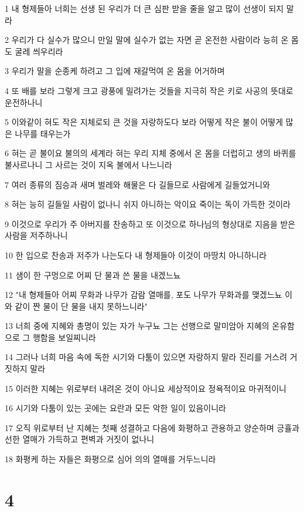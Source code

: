 \par 1 내 형제들아 너희는 선생 된 우리가 더 큰 심판 받을 줄을 알고 많이 선생이 되지 말라
\par 2 우리가 다 실수가 많으니 만일 말에 실수가 없는 자면 곧 온전한 사람이라 능히 온 몸도 굴레 씌우리라
\par 3 우리가 말을 순종케 하려고 그 입에 재갈먹여 온 몸을 어거하며
\par 4 또 배를 보라 그렇게 크고 광풍에 밀려가는 것들을 지극히 작은 키로 사공의 뜻대로 운전하나니
\par 5 이와같이 혀도 작은 지체로되 큰 것을 자랑하도다 보라 어떻게 작은 불이 어떻게 많은 나무를 태우는가
\par 6 혀는 곧 불이요 불의의 세계라 혀는 우리 지체 중에서 온 몸을 더럽히고 생의 바퀴를 불사르나니 그 사르는 것이 지옥 불에서 나느니라
\par 7 여러 종류의 짐승과 새며 벌레와 해물은 다 길들므로 사람에게 길들었거니와
\par 8 혀는 능히 길들일 사람이 없나니 쉬지 아니하는 악이요 죽이는 독이 가득한 것이라
\par 9 이것으로 우리가 주 아버지를 찬송하고 또 이것으로 하나님의 형상대로 지음을 받은 사람을 저주하나니
\par 10 한 입으로 찬송과 저주가 나는도다 내 형제들아 이것이 마땅치 아니하니라
\par 11 샘이 한 구멍으로 어찌 단 물과 쓴 물을 내겠느뇨
\par 12 "내 형제들아 어찌 무화과 나무가 감람 열매를, 포도 나무가 무화과를 맺겠느뇨 이와 같이 짠 물이 단 물을 내지 못하느니라"
\par 13 너희 중에 지혜와 총명이 있는 자가 누구뇨 그는 선행으로 말미암아 지혜의 온유함으로 그 행함을 보일찌니라
\par 14 그러나 너희 마음 속에 독한 시기와 다툼이 있으면 자랑하지 말라 진리를 거스려 거짓하지 말라
\par 15 이러한 지혜는 위로부터 내려온 것이 아니요 세상적이요 정욕적이요 마귀적이니
\par 16 시기와 다툼이 있는 곳에는 요란과 모든 악한 일이 있음이니라
\par 17 오직 위로부터 난 지혜는 첫째 성결하고 다음에 화평하고 관용하고 양순하며 긍휼과 선한 열매가 가득하고 편벽과 거짓이 없나니
\par 18 화평케 하는 자들은 화평으로 심어 의의 열매를 거두느니라

\chapter{4}

